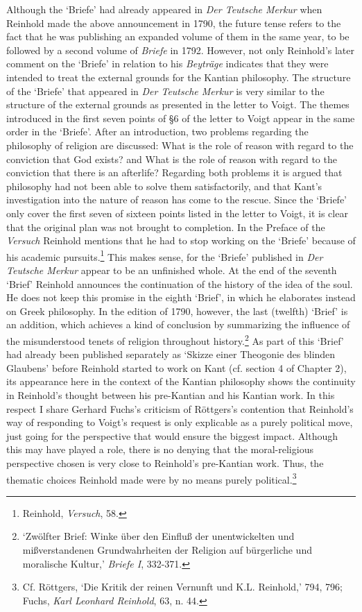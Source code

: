 Although the `Briefe' had already appeared in \textit{Der Teutsche Merkur} when Reinhold made the above announcement in 1790, the future tense refers to the fact that he was publishing an expanded volume of them in the same year, to be followed by a second volume of \textit{Briefe }in 1792. However, not only Reinhold's later comment on the `Briefe' in relation to his \textit{Beytr\"{a}ge} indicates that they were intended to treat the external grounds for the Kantian philosophy. The structure of the `Briefe' that appeared in \textit{Der Teutsche Merkur} is very similar to the structure of the external grounds as presented in the letter to Voigt. The themes introduced in the first seven points of \S  6 of the letter to Voigt appear in the same order in the `Briefe'. After an introduction, two problems regarding the philosophy of religion are discussed: What is the role of reason with regard to the conviction that God exists? and What is the role of reason with regard to the conviction that there is an afterlife? Regarding both problems it is argued that philosophy had not been able to solve them satisfactorily, and that Kant's investigation into the nature of reason has come to the rescue. Since the `Briefe' only cover the first seven of sixteen points listed in the letter to Voigt, it is clear that the original plan was not brought to completion. In the Preface of the\textit{ Versuch }Reinhold mentions that he had to stop working on the `Briefe' because of his academic pursuits.\footnote{ Reinhold, \textit{Versuch}, 58. } This makes sense, for the `Briefe' published in \textit{Der Teutsche Merkur} appear to be an unfinished whole. At the end of the seventh `Brief' Reinhold announces the continuation of the history of the idea of the soul. He does not keep this promise in the eighth `Brief', in which he elaborates instead on Greek philosophy. In the edition of 1790, however, the last (twelfth) `Brief' is an addition, which achieves a kind of conclusion by summarizing the influence of the misunderstood tenets of religion throughout history.\footnote{ `Zw\"{o}lfter Brief: Winke \"{u}ber den Einflu\ss{} der unentwickelten und mi\ss{}verstandenen Grundwahrheiten der Religion auf b\"{u}rgerliche und moralische Kultur,' \textit{Briefe I}, 332{-}371. } As part of this `Brief' had already been published separately as `Skizze einer Theogonie des blinden Glaubens' before Reinhold started to work on Kant (cf. section 4 of Chapter 2), its appearance here in the context of the Kantian philosophy shows the continuity in Reinhold's thought between his pre{-}Kantian and his Kantian work. In this respect I share Gerhard Fuchs's criticism of R\"{o}ttgers's contention that Reinhold's way of responding to Voigt's request is only explicable as a purely political move, just going for the perspective that would ensure the biggest impact. Although this may have played a role, there is no denying that the moral{-}religious perspective chosen is very close to Reinhold's pre{-}Kantian work. Thus, the thematic choices Reinhold made were by no means purely political.\footnote{ Cf. R\"{o}ttgers, `Die Kritik der reinen Vernunft und K.L. Reinhold,' 794, 796; Fuchs, \textit{Karl Leonhard Reinhold}, 63, n. 44. } 

